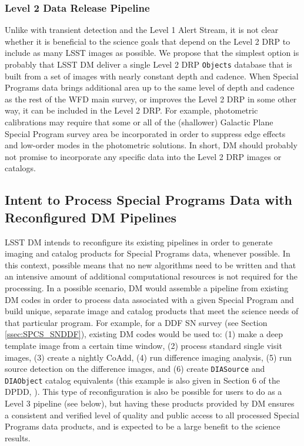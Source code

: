 \documentclass[DM,lsstdraft,toc]{lsstdoc}
\begin{document}
\subsubsection{Level 2 Data Release Pipeline}\label{ssec:dmplans_WFD_L2}

Unlike with transient detection and the Level 1 Alert Stream, it is not clear whether it is beneficial to the science goals that depend on the Level 2 DRP to include as many LSST images as possible. We propose that the simplest option is probably that LSST DM deliver a single Level 2 DRP {\tt Objects} database that is built from a set of images with nearly constant depth and cadence. When Special Programs data brings additional area up to the same level of depth and cadence as the rest of the WFD main survey, or improves the Level 2 DRP in some other way, it can be included in the Level 2 DRP. For example, photometric calibrations may require that some or all of the (shallower) Galactic Plane Special Program survey area be incorporated in order to suppress edge effects and low-order modes in the photometric solutions. In short, DM should probably not promise to incorporate any specific data into the Level 2 DRP images or catalogs.


\subsection{Intent to Process Special Programs Data with Reconfigured DM Pipelines}\label{ssec:dmplans_reconfig}

LSST DM intends to reconfigure its existing pipelines in order to generate imaging and catalog products for Special Programs data, whenever possible. In this context, possible means that no new algorithms need to be written and that an intensive amount of additional computational resources is not required for the processing. In a possible scenario, DM would assemble a pipeline from existing DM codes in order to process data associated with a given Special Program and build unique, separate image and catalog products that meet the science needs of that particular program. For example, for a DDF SN survey (see Section \ref{ssec:SPCS_SNDDF}), existing DM codes would be used to: (1) make a deep template image from a certain time window, (2) process standard single visit images, (3) create a nightly CoAdd, (4) run difference imaging analysis, (5) run source detection on the difference images, and (6) create {\tt DIASource} and {\tt DIAObject} catalog equivalents (this example is also given in Section 6 of the DPDD, \cite{LSE-163}). This type of reconfiguration is also be possible for users to do as a Level 3 pipeline (see below), but having these products provided by DM ensures a consistent and verified level of quality and public access to all processed Special Programs data products, and is expected to be a large benefit to the science results.
\end{document}
